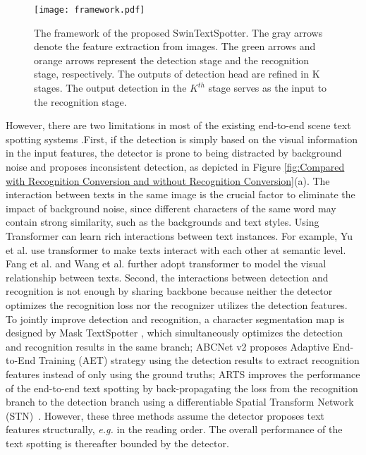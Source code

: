 \documentclass[10pt,twocolumn,letterpaper]{article}
\begin{document}
\begin{figure*}[htp]
    \centering
    \texttt{[image: framework.pdf]}
    \caption{
        The framework of the proposed SwinTextSpotter. The gray arrows denote the feature extraction from images. The green arrows and orange arrows represent the detection stage and the recognition stage, respectively. The outputs of detection head are refined in K stages. The output detection in the $K^{th}$ stage serves as the input to the recognition stage.
    }
    \label{fig:frame}

\end{figure*}

However, there are two limitations in most of the existing end-to-end scene text spotting systems \cite{lyu2018mask,feng2019textdragon,qin2019towards,qiao2020text,wang2020all,liao2020mask,liu2020abcnet}.First, if the detection is simply based on the visual information in the input features, the detector is prone to being distracted by background noise and proposes inconsistent detection, as depicted in Figure \ref{fig:Compared with Recognition Conversion and without Recognition Conversion}(a).
The interaction between texts in the same image is the crucial factor to eliminate the impact of background noise, since different characters of the same word may contain strong similarity, such as the backgrounds and text styles. Using Transformer \cite{vaswani2017attention} can learn rich interactions between text instances.
For example, Yu et al. \cite{yu2020towards} use transformer to make texts interact with each other at semantic level. Fang et al. \cite{fang2021read} and Wang et al. \cite{wang2021two} further adopt transformer to model the visual relationship between texts.
Second, the interactions between detection and recognition is not enough by sharing backbone because neither the detector optimizes the recognition loss nor the recognizer utilizes the detection features.
To jointly improve detection and recognition, 
a character segmentation map is designed by Mask TextSpotter \cite{liao2020mask}, which simultaneously optimizes the detection and recognition results in the same branch; 
ABCNet v2 \cite{liu2021abcnetv2} proposes Adaptive End-to-End Training (AET) strategy using the detection results to extract recognition features instead of only using the ground truths;
ARTS \cite{zhong2021arts} improves the performance of the end-to-end text spotting by back-propagating the loss from the recognition branch to the detection branch using a differentiable Spatial Transform Network (STN)~\cite{2015Spatial}. 
However, these three methods assume the detector proposes text features structurally, \textit{e.g.} in the reading order. The overall performance of the text spotting is thereafter bounded by the detector.
\end{document}
